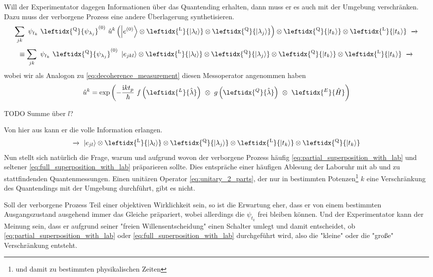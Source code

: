 \documentclass[12pt]{article}
\begin{document}
Will der Experimentator dagegen Informationen über das Quantending erhalten, dann muss er es auch mit der Umgebung verschränken. Dazu muss der verborgene Prozess eine andere Überlagerung synthetisieren.
\begin{equation*}
\sum_{jk} \ \psi_{t_k}\ \leftidx{^\mathrm{Q}}{\psi_{\lambda_j}}^{(0)}\ 
\hat{u}^k \left( \ket{e^{(0)}} \otimes \leftidx{^\mathrm{L}}{\ket{\lambda_l}} 
\otimes \leftidx{^\mathrm{Q}}{\ket{\lambda_j}} \right) 
\otimes \leftidx{^\mathrm{Q}}{\ket{t_k}}
\otimes \leftidx{^\mathrm{L}}{\ket{t_k}}
\ \xrightarrow{}
\end{equation*}
\begin{equation}
\label{eq:full_superposition_with_lab}
\equiv \sum_{jk} \ \psi_{t_k}\ \leftidx{^\mathrm{Q}}{\psi_{\lambda_j}}^{(0)}\ 
\ket{e_{jkl}} \otimes \leftidx{^\mathrm{L}}{\ket{\lambda_l}} 
\otimes \leftidx{^\mathrm{Q}}{\ket{\lambda_j}}
\otimes \leftidx{^\mathrm{Q}}{\ket{t_k}}
\otimes \leftidx{^\mathrm{L}}{\ket{t_k}}
\ \xrightarrow{}
\end{equation}
wobei wir als Analogon zu \eqref{eq:decoherence_measurement} diesen Messoperator angenommen haben
\begin{equation*}
\hat{u}^k = \mathrm{exp}\left(
-\frac{\mathrm{i}k t_p}{\hbar}\ f\left(\leftidx{^L}{\hat{\lambda}}\right)\ \otimes\  g\left(\leftidx{^Q}{\hat{\lambda}}\right)\ \otimes\ \leftidx{^E}{\hat{H}}
\right)
\end{equation*}

TODO Summe über $l$?

Von hier aus kann er die volle Information erlangen.
\begin{equation*}
\xrightarrow{}\ \ket{e_{jl}} 
\otimes \leftidx{^\mathrm{L}}{\ket{\lambda_l}} 
\otimes \leftidx{^\mathrm{Q}}{\ket{\lambda_j}}
\otimes \leftidx{^\mathrm{L}}{\ket{t_k}}
\otimes \leftidx{^\mathrm{Q}}{\ket{t_k}}
\end{equation*}
Nun stellt sich natürlich die Frage, warum und aufgrund wovon der verborgene Prozess häufig \eqref{eq:partial_superposition_with_lab} und seltener \eqref{eq:full_superposition_with_lab} präparieren sollte. Dies entspräche einer häufigen Ablesung der Laboruhr mit ab und zu stattfindenden Quantenmessungen. Einen unitären Operator \eqref{eq:unitary_2_parts}, der nur in bestimmten Potenzen\footnote{und damit zu bestimmten physikalischen Zeiten} $k$ eine Verschränkung des Quantendings mit der Umgebung durchführt, gibt es nicht.

Soll der verborgene Prozess Teil einer objektiven Wirklichkeit sein, so ist die Erwartung eher, dass er von einem bestimmten Ausgangszustand ausgehend immer das Gleiche präpariert, wobei allerdings die $\psi_{t_k}$ frei bleiben können. Und der Experimentator kann der Meinung sein, dass er aufgrund seiner "freien Willensentscheidung" einen Schalter umlegt und damit entscheidet, ob \eqref{eq:partial_superposition_with_lab} oder \eqref{eq:full_superposition_with_lab} durchgeführt wird, also die "kleine" oder die "große" Verschränkung entsteht.
\end{document}
